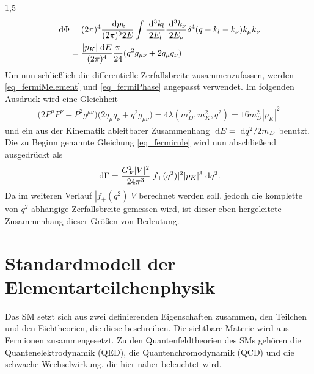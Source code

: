 \documentclass[11pt,a4paper,twoside]{report}
\begin{document}
\begin{spacing}{1,5}
\begin{align}
 \; \mathrm{d} \Phi &= (2\pi)^4 \frac{\; \mathrm{d} p_k}{(2\pi)^9 2E} \int \frac{\; \mathrm{d}^3k_l}{2E_l}\frac{\; \mathrm{d}^3k_\nu}{2E_\nu}\delta^4(q-k_l-k_\nu)k_\mu k_\nu \nonumber\\
 &= \frac{|p_K| \; \mathrm{d} E}{(2\pi)^4}\frac{\pi}{24}(q^2g_{\mu\nu} + 2 q_\mu q_\nu)
 \label{eq_fermiPhase}
\end{align}
Um nun schließlich die differentielle Zerfallsbreite zusammenzufassen, werden \eqref{eq_fermiMelement} und \eqref{eq_fermiPhase} angepasst verwendet. Im
folgenden Ausdruck wird eine Gleichheit
\begin{align}
 \big(2P^\mu P^\nu - P^2 g^{\mu\nu}\big)\big(2q_\mu q_\nu + q^2g_{\mu\nu}) = 4 \lambda(m_D^2,m_K^2,q^2) = 16 m_D^2 |p_K|^2
\end{align}
und ein aus der Kinematik ableitbarer Zusammenhang $\; \mathrm{d} E = \; \mathrm{d} q^2 / 2m_D$ benutzt. Die zu Beginn genannte Gleichung \eqref{eq_fermirule} wird 
nun abschließend ausgedrückt als
\begin{align}
 \; \mathrm{d} \Gamma = \frac{G_F^2|V|^2}{24\pi^3} |f_+(q^2)|^2 |p_K|^3 \; \mathrm{d} q^2.
 \label{eq_fermidGammafinal}
\end{align}
Da im weiteren Verlauf $|f_+(q^2)|V$ berechnet werden soll, jedoch die komplette von $q^2$ abhängige Zerfallsbreite gemessen wird, ist dieser eben hergeleitete
Zusammenhang dieser Größen von Bedeutung.



\section{Standardmodell der Elementarteilchenphysik}
Das SM setzt sich aus zwei definierenden Eigenschaften zusammen, den Teilchen und den Eichtheorien, die diese beschreiben. Die sichtbare Materie wird 
aus Fermionen zusammengesetzt. Zu den Quantenfeldtheorien des SMs gehören die Quantenelektrodynamik (QED), die Quantenchromodynamik (QCD) und die schwache
Wechselwirkung, die hier näher beleuchtet wird. 


\end{spacing}
\end{document}
